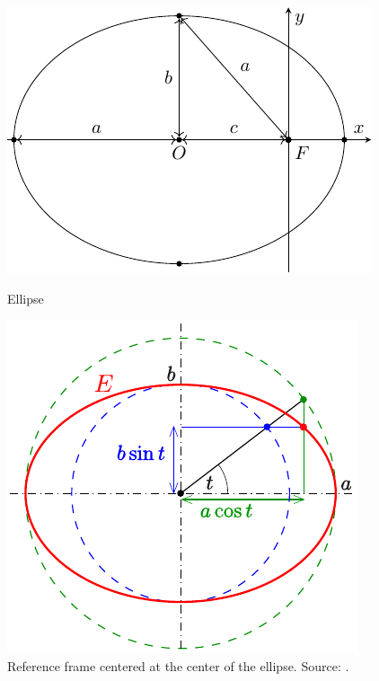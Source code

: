 \documentclass[../main.tex]{subfiles}
\begin{document}
\begin{figure}[htbp]
  \centering
  \begin{minipage}[ht]{0.47\textwidth}
    \centering
    \includegraphics[width=\textwidth]{Images/ellipse.pdf}
    \caption{Ellipse}
    \label{fig:ellipse}
  \end{minipage}
  \hspace{0.02\textwidth}
  \begin{minipage}[ht]{0.47\textwidth}
    \centering
    \includegraphics[width=\textwidth]{Images/circles-ellipse.pdf}
    \caption{Reference frame centered at the center of the ellipse. Source: \cite{wiki:conic-ellipse}.}
    \label{fig:circle-ellipse}
  \end{minipage}
\end{figure}
\end{document}
